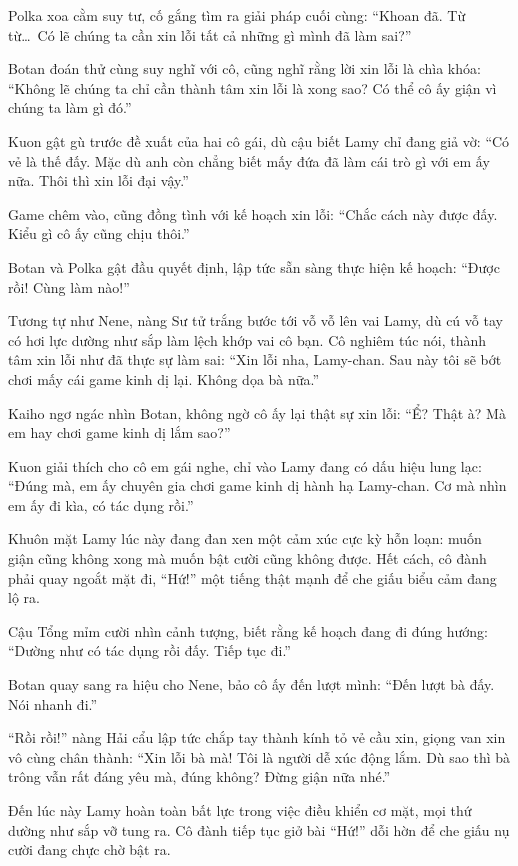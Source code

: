 \documentclass[../main.tex]{subfiles}
\begin{document}
Polka xoa cằm suy tư, cố gắng tìm ra giải pháp cuối cùng: ``Khoan đã. Từ từ\dots\ Có lẽ chúng ta cần xin lỗi tất cả những gì mình đã làm sai?''

Botan đoán thử cùng suy nghĩ với cô, cũng nghĩ rằng lời xin lỗi là chìa khóa: ``Không lẽ chúng ta chỉ cần thành tâm xin lỗi là xong sao? Có thể cô ấy giận vì chúng ta làm gì đó.''

Kuon gật gù trước đề xuất của hai cô gái, dù cậu biết Lamy chỉ đang giả vờ: ``Có vẻ là thế đấy. Mặc dù anh còn chẳng biết mấy đứa đã làm cái trò gì với em ấy nữa. Thôi thì xin lỗi đại vậy.''

Game chêm vào, cũng đồng tình với kế hoạch xin lỗi: ``Chắc cách này được đấy. Kiểu gì cô ấy cũng chịu thôi.''

Botan và Polka gật đầu quyết định, lập tức sẵn sàng thực hiện kế hoạch: ``Được rồi! Cùng làm nào!''

Tương tự như Nene, nàng Sư tử trắng bước tới vỗ vỗ lên vai Lamy, dù cú vỗ tay có hơi lực dường như sắp làm lệch khớp vai cô bạn. Cô nghiêm túc nói, thành tâm xin lỗi như đã thực sự làm sai: ``Xin lỗi nha, Lamy-chan. Sau này tôi sẽ bớt chơi mấy cái game kinh dị lại. Không dọa bà nữa.''


Kaiho ngơ ngác nhìn Botan, không ngờ cô ấy lại thật sự xin lỗi: ``Ể? Thật à? Mà em hay chơi game kinh dị lắm sao?''

Kuon giải thích cho cô em gái nghe, chỉ vào Lamy đang có dấu hiệu lung lạc: ``Đúng mà, em ấy chuyên gia chơi game kinh dị hành hạ Lamy-chan. Cơ mà nhìn em ấy đi kìa, có tác dụng rồi.''

Khuôn mặt Lamy lúc này đang đan xen một cảm xúc cực kỳ hỗn loạn: muốn giận cũng không xong mà muốn bật cười cũng không được. Hết cách, cô đành phải quay ngoắt mặt đi, ``Hứ!'' một tiếng thật mạnh để che giấu biểu cảm đang lộ ra.

Cậu Tổng mỉm cười nhìn cảnh tượng, biết rằng kế hoạch đang đi đúng hướng: ``Dường như có tác dụng rồi đấy. Tiếp tục đi.''

Botan quay sang ra hiệu cho Nene, bảo cô ấy đến lượt mình: ``Đến lượt bà đấy. Nói nhanh đi.''

``Rồi rồi!'' nàng Hải cẩu lập tức chắp tay thành kính tỏ vẻ cầu xin, giọng van xin vô cùng chân thành: ``Xin lỗi bà mà! Tôi là người dễ xúc động lắm. Dù sao thì bà trông vẫn rất đáng yêu mà, đúng không? Đừng giận nữa nhé.''


Đến lúc này Lamy hoàn toàn bất lực trong việc điều khiển cơ mặt, mọi thứ dường như sắp vỡ tung ra. Cô đành tiếp tục giở bài ``Hứ!'' dỗi hờn để che giấu nụ cười đang chực chờ bật ra.
\end{document}
